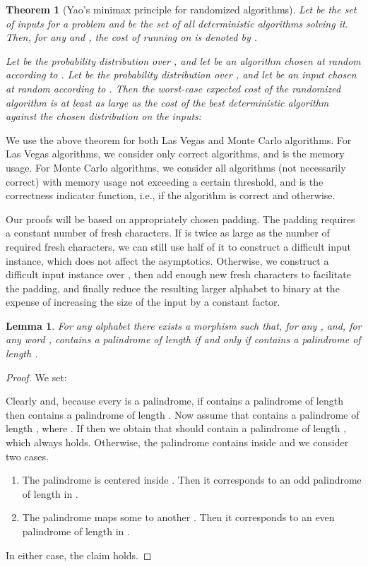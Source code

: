 \documentclass{article}[11pt,letter]
\newtheorem{lemma}[definition]{Lemma}
\newtheorem{theorem}[definition]{Theorem}
\newcommand{\ie}{i.e.\xspace}
\begin{document}
\begin{theorem}[Yao's minimax principle for randomized algorithms]
\label{yao}
Let  be the set of inputs for a problem and  be the set of all deterministic algorithms solving it. Then,
for any  and , the cost of running  on  is denoted by .

Let  be the probability distribution over , and let  be an algorithm chosen at random according to . Let  be
the probability distribution over , and let  be an input chosen at random according to . Then
the worst-case expected cost of the randomized algorithm is at least as large as the cost of the best deterministic algorithm against the chosen
distribution on the inputs:

\end{theorem}

We use the above theorem for both Las Vegas and Monte Carlo algorithms. For Las Vegas algorithms, we consider only correct algorithms, and  is the
memory usage.
For Monte Carlo algorithms, we consider all algorithms (not necessarily correct) with memory usage not exceeding a certain threshold,
and  is the correctness indicator function, \ie,  if the algorithm is correct and  otherwise.

Our proofs will be based on appropriately chosen padding. The padding requires a constant number
of fresh characters.
If  is twice as large as the number of required fresh characters, we can still use half of
it to construct a difficult input instance, which does not affect the asymptotics. Otherwise,
we construct a difficult input instance over , then add enough new fresh characters
to facilitate the padding, and finally reduce the resulting larger alphabet to binary at the expense
of increasing the size of the input by a constant factor.

\begin{lemma}
\label{alphabetreduction}
For any alphabet  there exists a morphism  such that, for any ,  and, for any word ,  contains a palindrome
of length  if and only if  contains a palindrome of length .
\end{lemma}

\begin{proof}
We set:

Clearly  and, because every  is a palindrome, if  contains a palindrome
of length  then  contains a palindrome of length . Now assume that
 contains a palindrome of length , where . 
If  then we obtain that  should contain a palindrome of length , which always holds.
Otherwise, the palindrome contains  inside and we consider two cases.
\begin{enumerate}
\item The palindrome is centered inside . Then it corresponds to an odd palindrome of length
 in .
\item The palindrome maps some  to another . Then it corresponds to an even palindrome
of length  in .
\end{enumerate}
In either case, the claim holds.
\end{proof}
\end{document}
